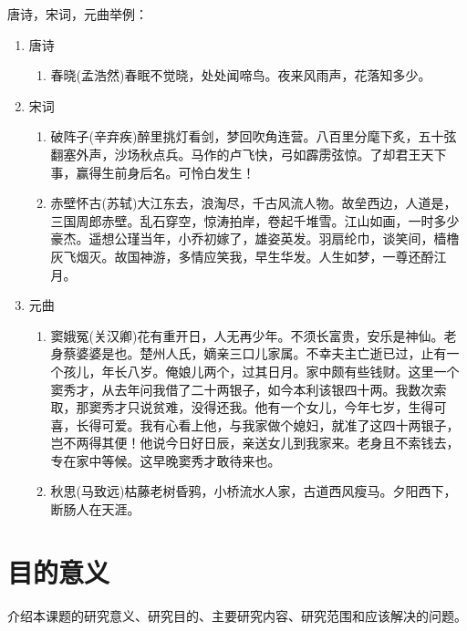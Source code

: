 唐诗，宋词，元曲举例：
\begin{enumerate}
	\item 唐诗
	\begin{enumerate} 
		\item 春晓(孟浩然)春眠不觉晓，处处闻啼鸟。夜来风雨声，花落知多少。
	\end{enumerate}
	\item 宋词
	\begin{enumerate}
		\item 破阵子(辛弃疾)醉里挑灯看剑，梦回吹角连营。八百里分麾下炙，五十弦翻塞外声，沙场秋点兵。马作的卢飞快，弓如霹雳弦惊。了却君王天下事，赢得生前身后名。可怜白发生！
		\item 赤壁怀古(苏轼)大江东去，浪淘尽，千古风流人物。故垒西边，人道是，三国周郎赤壁。乱石穿空，惊涛拍岸，卷起千堆雪。江山如画，一时多少豪杰。遥想公瑾当年，小乔初嫁了，雄姿英发。羽扇纶巾，谈笑间，樯橹灰飞烟灭。故国神游，多情应笑我，早生华发。人生如梦，一尊还酹江月。
	\end{enumerate}
	\item 元曲
	\begin{enumerate}
		\item 窦娥冤(关汉卿)花有重开日，人无再少年。不须长富贵，安乐是神仙。老身蔡婆婆是也。楚州人氏，嫡亲三口儿家属。不幸夫主亡逝已过，止有一个孩儿，年长八岁。俺娘儿两个，过其日月。家中颇有些钱财。这里一个窦秀才，从去年问我借了二十两银子，如今本利该银四十两。我数次索取，那窦秀才只说贫难，没得还我。他有一个女儿，今年七岁，生得可喜，长得可爱。我有心看上他，与我家做个媳妇，就准了这四十两银子，岂不两得其便！他说今日好日辰，亲送女儿到我家来。老身且不索钱去，专在家中等候。这早晚窦秀才敢待来也。
		\item 秋思(马致远)枯藤老树昏鸦，小桥流水人家，古道西风瘦马。夕阳西下，断肠人在天涯。
	\end{enumerate}
\end{enumerate}

\section{目的意义}\label{sec:meaningful}
介绍本课题的研究意义、研究目的、主要研究内容、研究范围和应该解决的问题。

